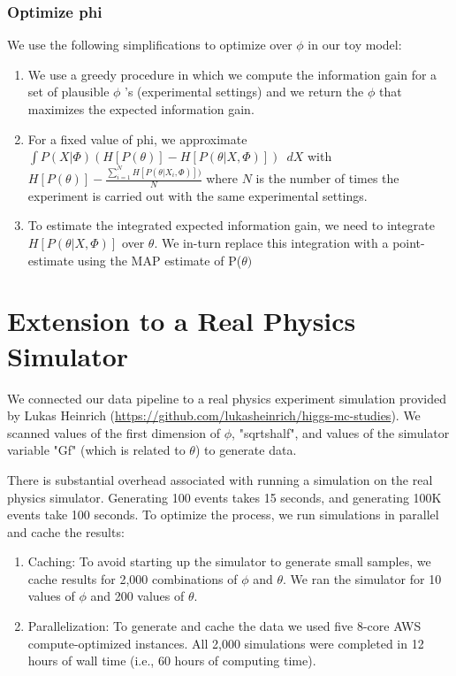 \documentclass[10pt,journal,compsoc]{IEEEtran}
\begin{document}
\subsubsection{Optimize phi}
We use the following simplifications to optimize over $\phi$  in our toy model:

\begin{enumerate}
\item We use a greedy procedure in which we compute the information gain for a set of plausible $\phi$ 's (experimental settings) and we return the $\phi$ that maximizes the expected information gain.
\item  For a fixed value of phi, we approximate $\int P(X|\Phi) (H[P(\theta)]-H[P(\theta|X,\Phi)])$ $\, dX$  with $H[P(\theta)] -    \frac{\sum_{i=1}^N H[P(\theta|X_i,     \Phi)])}{N}$  where $N$ is the number of times the experiment is carried out with the same experimental settings.
\item To estimate the integrated expected information gain, we need to integrate $H[P(\theta|X,\Phi)]$  over $\theta$. We in-turn replace this integration with a point-estimate using the MAP estimate of P($\theta)$  \end{enumerate}

\section{Extension to a Real Physics Simulator}
We connected our data pipeline to a real physics experiment simulation provided by Lukas Heinrich (\url{https://github.com/lukasheinrich/higgs-mc-studies}). We scanned values of the first dimension of $\phi$, "sqrtshalf", and values of the simulator variable "Gf" (which is related to $\theta$) to generate data.

There is substantial overhead associated with running a simulation on the real physics simulator. Generating 100 events takes 15 seconds, and generating 100K events take 100 seconds. To optimize the process, we run simulations in parallel and cache the results:

\begin{enumerate}
\item Caching:  To avoid starting up the simulator to generate small samples, we cache results for 2,000 combinations of $\phi$ and $\theta$. We ran the simulator for 10 values of $\phi$ and 200 values of $\theta$.
\item Parallelization: To generate and cache the data we used five 8-core AWS compute-optimized instances. All 2,000 simulations were completed in 12 hours of wall time (i.e., 60 hours of computing time). 
\end{enumerate}
\end{document}
